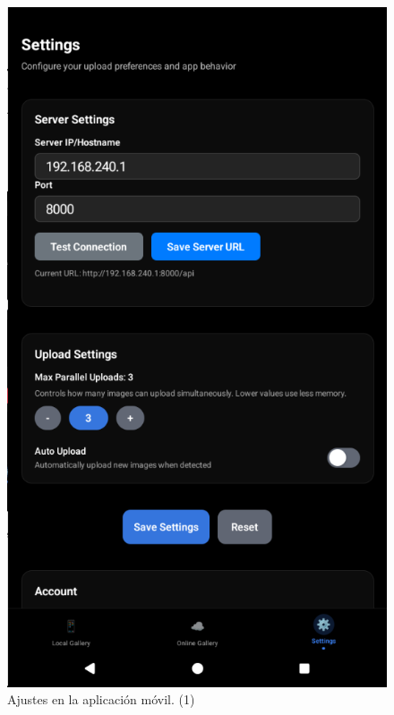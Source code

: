 \begin{figure}[H]
  \begin{minipage}[t]{0.3\textwidth}
    \centering
    \includegraphics[width=\textwidth]{assets/settings-mobile1.png}
    \caption{Ajustes en la aplicación móvil. (1)}
    \label{fig:settings-mobile1}
  \end{minipage}
  \hfill
  \begin{minipage}[t]{0.3\textwidth}
    \centering

\end{minipage}
\end{figure}
